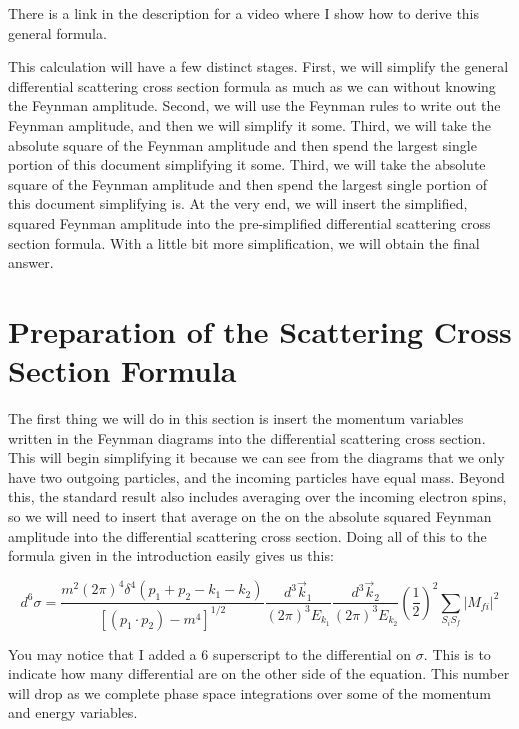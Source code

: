 \documentclass[a4]{article}
\begin{document}
    There is a link in the description for a video where I show how to derive this general formula.

    This calculation will have a few distinct stages. First, we will simplify the general differential scattering cross section formula as much as we can without knowing the Feynman amplitude. Second, we will use the
    Feynman rules to write out the Feynman amplitude, and then we will simplify it some. Third, we will take the absolute square of the Feynman amplitude and then spend the largest single portion of this document
    simplifying it some. Third, we will take the absolute square of the Feynman amplitude and then spend the largest single portion of this document simplifying is. At the very end, we will insert the simplified,
    squared Feynman amplitude into the pre-simplified differential scattering cross section formula. With a little bit more simplification, we  will obtain the final answer.

    \section*{Preparation of the Scattering Cross Section Formula}

    The first thing we will do in this section is insert the momentum variables written in the Feynman diagrams into the differential scattering cross section. This will begin simplifying it because we can see from the
    diagrams that we only have two outgoing particles, and the incoming particles have equal mass. Beyond this, the standard result also includes averaging over the incoming electron spins, so we will need to insert 
    that average on the on the absolute squared Feynman amplitude into the differential scattering cross section. Doing all of this to the formula given in the introduction easily gives us this:

    \begin{equation}
        d^6 \sigma = \frac{m^2 (2 \pi)^4 \delta^4 (p_1 + p_2 - k_1 - k_2)}{[(p_1 \cdot p_2) - m^4]^{1/2}} \frac{d^3 \vec{k}_1}{(2 \pi)^3 E_{k_1}} \frac{d^3 \vec{k}_2}{(2 \pi)^3 E_{k_2}} (\frac{1}{2})^2 \sum_{S_i S_f} |M_{fi}|^2
    \end{equation}

    You may notice that I added a 6 superscript to the differential on $\sigma$. This is to indicate how many differential are on the other side of the equation. This number will drop as we complete phase space integrations
    over some of the momentum and energy variables.
\end{document}
